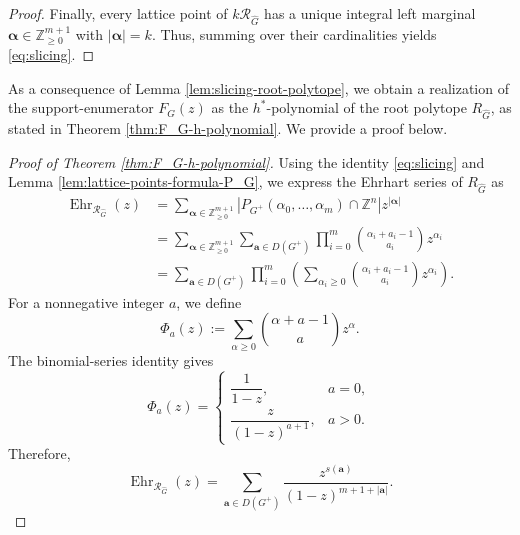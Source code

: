 \documentclass[11pt,a4paper]{article}
\newcommand{\vct}[1]{\boldsymbol{#1}}
\newcommand{\Z}{\mathbb{Z}}
\newcommand{\Ehr}{\operatorname{Ehr}}
\newcommand{\1}{\mathbf{1}}
\theoremstyle{plain}
\theoremstyle{definition}
\begin{document}
\begin{proof}
Finally, every lattice point of $k\mathcal R_{\widehat G}$ has a unique integral left marginal $\vct{\alpha}\in\Z_{\ge0}^{m+1}$ with $|\vct{\alpha}|=k$. Thus, summing over their cardinalities yields \eqref{eq:slicing}.
\end{proof}

As a consequence of Lemma \ref{lem:slicing-root-polytope}, we obtain a realization of the support-enumerator $F_G(z)$ as the $h^*$-polynomial of the root polytope $R_{\widehat G}$, as stated in Theorem \ref{thm:F_G-h-polynomial}. We provide a proof below.
\begin{proof}[Proof of Theorem \ref{thm:F_G-h-polynomial}]
Using the identity \eqref{eq:slicing} and Lemma \ref{lem:lattice-points-formula-P_G}, we express the Ehrhart series of $R_{\widehat G}$ as
\begin{align*}
\Ehr_{\mathcal R_{\widehat G}}(z)
&=\sum_{\vct{\alpha}\in\Z_{\ge0}^{m+1}}
|P_{G^+}(\alpha_0,\ldots,\alpha_m)\cap\Z^n|z^{|\vct{\alpha}|}\\
&=\sum_{\vct{\alpha}\in\Z_{\ge0}^{m+1}}
\sum_{\vct{a}\in D(G^+)}
\prod_{i=0}^m\binom{\alpha_i+a_i-1}{a_i}z^{\alpha_i}\\
&=\sum_{\vct{a}\in D(G^+)}
\prod_{i=0}^m\left(
\sum_{\alpha_i\ge0}\binom{\alpha_i+a_i-1}{a_i}z^{\alpha_i}
\right).
\end{align*}
For a nonnegative integer $a$, we define
\[
\Phi_a(z):=\sum_{\alpha\ge0}\binom{\alpha+a-1}{a}z^\alpha.
\]
The binomial-series identity gives
\begin{equation}
\Phi_a(z)=
\begin{cases}
\dfrac{1}{1-z},&a=0,\\[4pt]
\dfrac{z}{(1-z)^{a+1}},&a>0.
\end{cases}
\label{eq:Phi}
\end{equation}
Therefore,
\begin{equation}
\Ehr_{\mathcal R_{\widehat G}}(z)
=\sum_{\vct{a}\in D(G^+)}
\frac{z^{s(\vct{a})}}{(1-z)^{m+1+|\vct{a}|}}.
\label{eq:Ehr-Gplus}
\end{equation}


\end{proof}
\end{document}
